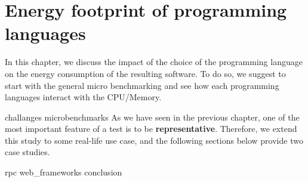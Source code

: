 \newpage

\chapter{Energy footprint of programming languages}
\label{chapter:porgramming_langauges}
In this chapter, we discuss the impact of the choice of the programming language on the energy consumption of the resulting software.
To do so, we suggest to start with the general micro benchmarking and see how each programming languages interact with the CPU/Memory.



{challanges}
{microbenchmarks}
As we have seen in the previous chapter, one of the most important feature of a test is to be \textbf{representative}.
Therefore, we extend this study to some real-life use case, and the following sections below provide two case studies.

{rpc}
{web_frameworks}
{conclusion}
